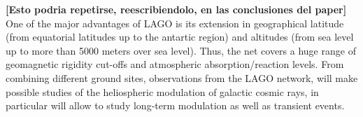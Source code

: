 {\bf [Esto podria repetirse, reescribiendolo, en las conclusiones del paper]}
One of the major advantages of LAGO is its extension in geographical latitude (from equatorial latitudes up to the antartic region) and
altitudes (from sea level up to more than 5000 meters over sea level). Thus, the net covers a huge range of geomagnetic rigidity cut-offs
and atmospheric absorption/reaction levels.
From combining different ground sites, observations from the LAGO network, will make possible studies of the heliospheric modulation of galactic cosmic rays,
in particular will allow to study long-term modulation as well as transient events.

